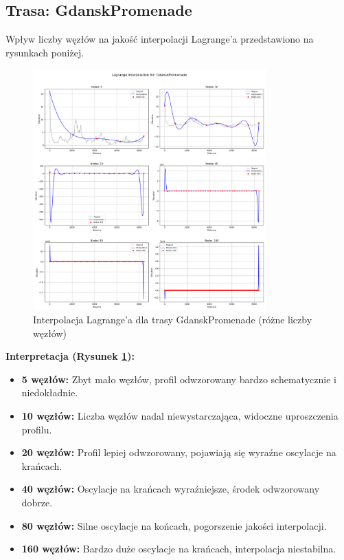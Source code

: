 \documentclass[11pt,a4paper]{article}
\begin{document}
\subsection{Trasa: GdanskPromenade}
Wpływ liczby węzłów na jakość interpolacji Lagrange'a przedstawiono na rysunkach poniżej.

\begin{figure}[H]
    \centering
    \includegraphics[width=0.8\textwidth]{../plots/GdanskPromenade_Lagrange_basic.png}
    \caption{Interpolacja Lagrange'a dla trasy GdanskPromenade (różne liczby węzłów)}
    \label{fig:promenade_lagrange}
\end{figure}
\textbf{Interpretacja (Rysunek \ref{fig:promenade_lagrange}):} 
\begin{itemize}
    \item \textbf{5 węzłów:} Zbyt mało węzłów, profil odwzorowany bardzo schematycznie i niedokładnie.
    \item \textbf{10 węzłów:} Liczba węzłów nadal niewystarczająca, widoczne uproszczenia profilu.
    \item \textbf{20 węzłów:} Profil lepiej odwzorowany, pojawiają się wyraźne oscylacje na krańcach.
    \item \textbf{40 węzłów:} Oscylacje na krańcach wyraźniejsze, środek odwzorowany dobrze.
    \item \textbf{80 węzłów:} Silne oscylacje na końcach, pogorszenie jakości interpolacji.
    \item \textbf{160 węzłów:} Bardzo duże oscylacje na krańcach, interpolacja niestabilna.
\end{itemize}
\end{document}
